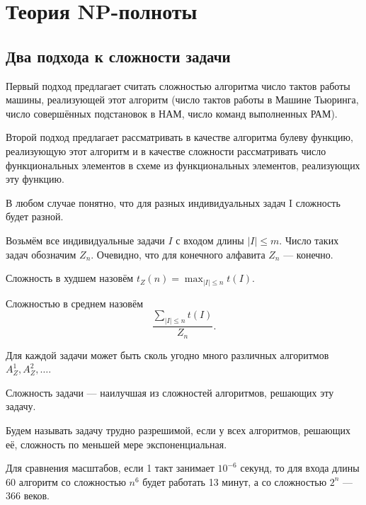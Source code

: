 \setchapterpreamble[u]{\margintoc}
\chapter{Теория NP-полноты}

\section{Два подхода к сложности задачи}
Первый подход предлагает считать сложностью алгоритма число тактов работы
машины, реализующей этот алгоритм (число тактов работы в Машине Тьюринга, число
совершённых подстановок в НАМ, число команд выполненных РАМ).

Второй подход предлагает рассматривать в качестве алгоритма булеву функцию,
реализующую этот алгоритм и в качестве сложности рассматривать число
функциональных элементов в схеме из функциональных элементов, реализующих эту
функцию. 

В любом случае понятно, что для разных индивидуальных задач I сложность будет разной. 

Возьмём все индивидуальные задачи $I$ с входом длины $|I| \le m$. Число таких
задач обозначим $Z_n$. Очевидно, что для конечного алфавита  $Z_n$ --- конечно. 

\begin{definition}
	Сложность в худшем назовём $t_Z(n) = \max_{|I|\le n} t(I)$. 
\end{definition}

\begin{definition}
	Сложностью в среднем назовём \[
		\frac{\sum\limits_{|I|\le n} t\left( I \right) }{Z_n}
	.\] 
\end{definition}

Для каждой задачи может быть сколь угодно много различных алгоритмов $A_Z^1,
A_Z^2, \ldots$. 
\begin{definition}
	Сложность задачи --- наилучшая из сложностей алгоритмов, решающих эту
	задачу.
\end{definition}

\begin{definition}
	Будем называть задачу трудно разрешимой, если у всех алгоритмов,
	решающих её, сложность по меньшей мере экспоненциальная. \cite{Aho}
\end{definition}
Для сравнения масштабов, если 1 такт занимает $10^{-6}$ секунд, то для входа
длины 60 алгоритм со сложностью  $n^6$ будет работать 13 минут, а со сложностью
$2^n$ --- 366 веков.

